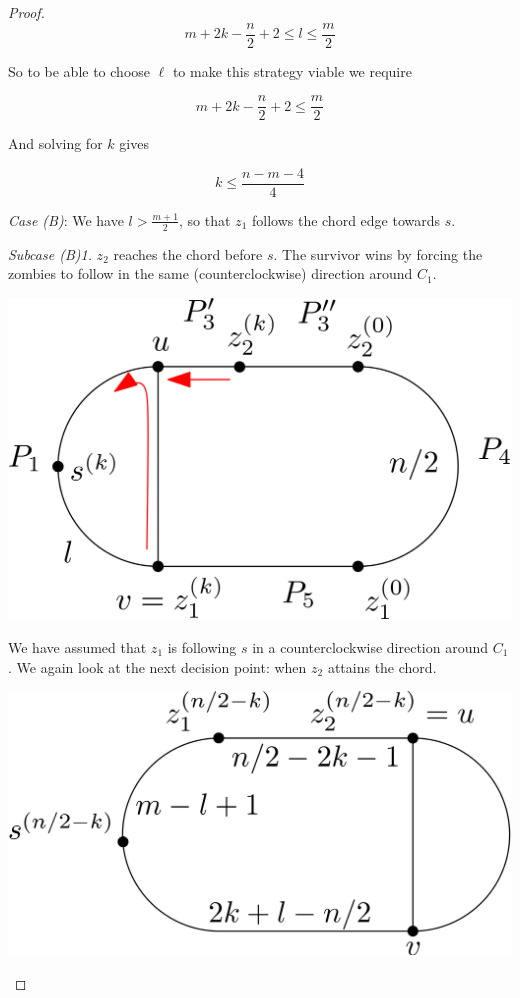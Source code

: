 \documentclass[letterpaper, 10pt]{article}
\begin{document}
\begin{proof}
\[ m+2k-\frac{n}{2} +2 \leq l \leq \frac{m}{2} \]

So to be able to choose $\ell$ to make this strategy viable we require

\[ m+2k-\frac{n}{2} +2 \leq \frac{m}{2} \]

And solving for $k$ gives

\[ k \leq \frac{n-m-4}{4} \]

\emph{Case (B)}: We have $l > \frac{m+1}{2}$, so that $z_1$ follows the chord edge towards $s$.

\emph{Subcase (B)1.} $z_2$ reaches the chord before $s$. The survivor wins by forcing
the zombies to follow in the same (counterclockwise) direction around $C_1$.

\begin{center}
\includegraphics[scale=0.15]{diagramCaseB1_1}
\end{center}

We have assumed that $z_1$ is following $s$ in a counterclockwise direction around $C_1$. We again
look at the next decision point: when $z_2$ attains the chord.

\begin{center}
\includegraphics[scale=0.15]{diagramCaseB1_2}
\end{center}


\end{proof}
\end{document}
